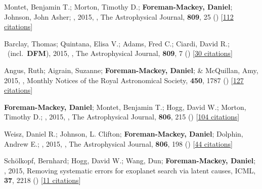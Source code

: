 \item[{\color{numcolor}\scriptsize13}] Montet, Benjamin T.; Morton, Timothy D.; \textbf{Foreman-Mackey, Daniel}; Johnson, John Asher; \etal, 2015, , The Astrophysical Journal, \textbf{809}, 25 () [\href{https://ui.adsabs.harvard.edu/abs/2015ApJ...809...25M}{112 citations}]

\item[{\color{numcolor}\scriptsize12}] Barclay, Thomas; Quintana, Elisa V.; Adams, Fred C.; Ciardi, David R.; \etal\ (incl.\ \textbf{DFM}), 2015, , The Astrophysical Journal, \textbf{809}, 7 () [\href{https://ui.adsabs.harvard.edu/abs/2015ApJ...809....7B}{30 citations}]

\item[{\color{numcolor}\scriptsize11}] Angus, Ruth; Aigrain, Suzanne; \textbf{Foreman-Mackey, Daniel}; \& McQuillan, Amy, 2015, , Monthly Notices of the Royal Astronomical Society, \textbf{450}, 1787 () [\href{https://ui.adsabs.harvard.edu/abs/2015MNRAS.450.1787A}{127 citations}]

\item[{\color{numcolor}\scriptsize10}] \textbf{Foreman-Mackey, Daniel}; Montet, Benjamin T.; Hogg, David W.; Morton, Timothy D.; \etal, 2015, , The Astrophysical Journal, \textbf{806}, 215 () [\href{https://ui.adsabs.harvard.edu/abs/2015ApJ...806..215F}{104 citations}]

\item[{\color{numcolor}\scriptsize9}] Weisz, Daniel R.; Johnson, L. Clifton; \textbf{Foreman-Mackey, Daniel}; Dolphin, Andrew E.; \etal, 2015, , The Astrophysical Journal, \textbf{806}, 198 () [\href{https://ui.adsabs.harvard.edu/abs/2015ApJ...806..198W}{44 citations}]

\item[{\color{numcolor}\scriptsize8}] Sch{\"o}lkopf, Bernhard; Hogg, David W.; Wang, Dun; \textbf{Foreman-Mackey, Daniel}; \etal, 2015, Removing systematic errors for exoplanet search via latent causes, ICML, \textbf{37}, 2218 () [\href{https://scholar.google.com/scholar?cites=11768165421845046384}{11 citations}]

